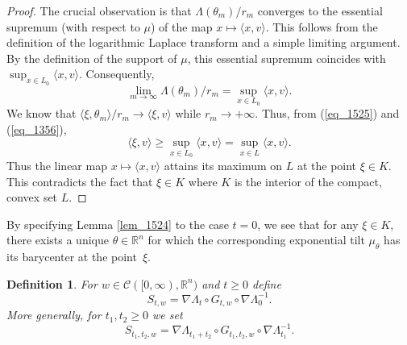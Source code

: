 \documentclass[12pt,a4paper]{article}
\newcommand{\R}{\mathbb{R}}
\newtheorem{definition}[theorem]{Definition}
\theoremstyle{definition}
\begin{document}
\begin{proof}
\medskip The crucial observation is that $\Lambda (\theta_m ) /r_m$
converges to the essential supremum (with respect to $\mu$) of
the map $x\mapsto\langle x,v\rangle$. This follows from the definition of the logarithmic 
Laplace transform and a simple limiting argument. 
By the definition of the support of $\mu$,
this essential supremum coincides with $ \sup_{x\in L_0} \langle x , v\rangle$. Consequently,
\begin{equation}
\lim_{m \rightarrow \infty} \Lambda (\theta_m ) /r_m = \sup_{x\in L_0} \langle x , v\rangle.
\label{eq_1356}
\end{equation}
We know that $\langle  \xi  , \theta_m \rangle /r_m \to \langle \xi, v \rangle$
while $r_m \longrightarrow +\infty$. Thus, from (\ref{eq_1525}) and (\ref{eq_1356}), 
\[
\langle \xi , v \rangle \geq \sup_{x\in L_0} \langle x , v \rangle
 = \sup_{x\in L} \langle x , v\rangle.
\]
Thus the linear map $x\mapsto \langle x , v\rangle$ attains its maximum
on $L$ at the point $\xi \in K$. This contradicts the fact that $\xi \in K$ where $K$ is the interior of the compact, convex set $L$.
\end{proof}

By specifying Lemma \ref{lem_1524} to the case $t=0$, we see  that for any $\xi\in K$, there exists a unique $\theta\in \R^n$ for which the corresponding exponential
tilt $\mu_\theta$ has its barycenter at the point~$\xi$. 

\begin{definition}
For  $w \in \mathcal C ( [0,\infty) , \R^n)$ and $t\geq0$ define 
\[
S_{t,w} = \nabla \Lambda_t \circ G_{t,w} \circ \nabla \Lambda_0^{-1} .
\]
More generally, for $t_1,t_2 \geq 0$ we set
\[
S_{t_1,t_2,w} = \nabla \Lambda_{t_1+t_2} \circ G_{t_1,t_2,w} \circ \nabla \Lambda_{t_1}^{-1} .
\] \label{def_1942}
\end{definition}
\end{document}
